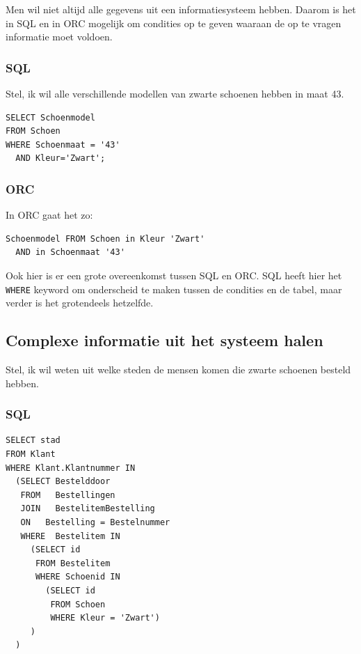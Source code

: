 \documentclass[10pt]{article}
\begin{document}
Men wil niet altijd alle gegevens uit een informatiesysteem hebben. Daarom is
het in SQL en in ORC mogelijk om condities op te geven waaraan de op te vragen
informatie moet voldoen.

\subsubsection{SQL}

Stel, ik wil alle verschillende modellen van zwarte schoenen hebben in maat 43.

\begin{verbatim}
SELECT Schoenmodel 
FROM Schoen 
WHERE Schoenmaat = '43' 
  AND Kleur='Zwart';
\end{verbatim}

\subsubsection{ORC}

In ORC gaat het zo: 

\begin{verbatim}
Schoenmodel FROM Schoen in Kleur 'Zwart' 
  AND in Schoenmaat '43'
\end{verbatim}

Ook hier is er een grote overeenkomst tussen SQL en ORC. SQL heeft hier het 
\verb+WHERE+ keyword om onderscheid te maken tussen de condities en de 
tabel, maar verder is het grotendeels hetzelfde. 

\subsection{Complexe informatie uit het systeem halen}

Stel, ik wil weten uit welke steden de mensen komen die zwarte schoenen 
besteld hebben.

\subsubsection{SQL}

\begin{verbatim}
SELECT stad
FROM Klant
WHERE Klant.Klantnummer IN 
  (SELECT Bestelddoor
   FROM   Bestellingen 
   JOIN   BestelitemBestelling
   ON   Bestelling = Bestelnummer
   WHERE  Bestelitem IN 
     (SELECT id 
      FROM Bestelitem
      WHERE Schoenid IN
        (SELECT id
         FROM Schoen
         WHERE Kleur = 'Zwart')
     )
  )   
\end{verbatim}
\end{document}
